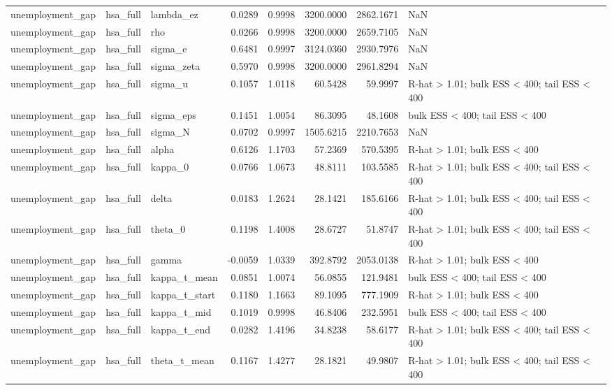 \begin{tabular}{lllrrrrl}
unemployment\_gap & hsa\_full & lambda\_ez & 0.0289 & 0.9998 & 3200.0000 & 2862.1671 & NaN \\
unemployment\_gap & hsa\_full & rho & 0.0266 & 0.9998 & 3200.0000 & 2659.7105 & NaN \\
unemployment\_gap & hsa\_full & sigma\_e & 0.6481 & 0.9997 & 3124.0360 & 2930.7976 & NaN \\
unemployment\_gap & hsa\_full & sigma\_zeta & 0.5970 & 0.9998 & 3200.0000 & 2961.8294 & NaN \\
unemployment\_gap & hsa\_full & sigma\_u & 0.1057 & 1.0118 & 60.5428 & 59.9997 & R-hat > 1.01; bulk ESS < 400; tail ESS < 400 \\
unemployment\_gap & hsa\_full & sigma\_eps & 0.1451 & 1.0054 & 86.3095 & 48.1608 & bulk ESS < 400; tail ESS < 400 \\
unemployment\_gap & hsa\_full & sigma\_N & 0.0702 & 0.9997 & 1505.6215 & 2210.7653 & NaN \\
unemployment\_gap & hsa\_full & alpha & 0.6126 & 1.1703 & 57.2369 & 570.5395 & R-hat > 1.01; bulk ESS < 400 \\
unemployment\_gap & hsa\_full & kappa\_0 & 0.0766 & 1.0673 & 48.8111 & 103.5585 & R-hat > 1.01; bulk ESS < 400; tail ESS < 400 \\
unemployment\_gap & hsa\_full & delta & 0.0183 & 1.2624 & 28.1421 & 185.6166 & R-hat > 1.01; bulk ESS < 400; tail ESS < 400 \\
unemployment\_gap & hsa\_full & theta\_0 & 0.1198 & 1.4008 & 28.6727 & 51.8747 & R-hat > 1.01; bulk ESS < 400; tail ESS < 400 \\
unemployment\_gap & hsa\_full & gamma & -0.0059 & 1.0339 & 392.8792 & 2053.0138 & R-hat > 1.01; bulk ESS < 400 \\
unemployment\_gap & hsa\_full & kappa\_t\_mean & 0.0851 & 1.0074 & 56.0855 & 121.9481 & bulk ESS < 400; tail ESS < 400 \\
unemployment\_gap & hsa\_full & kappa\_t\_start & 0.1180 & 1.1663 & 89.1095 & 777.1909 & R-hat > 1.01; bulk ESS < 400 \\
unemployment\_gap & hsa\_full & kappa\_t\_mid & 0.1019 & 0.9998 & 46.8406 & 232.5951 & bulk ESS < 400; tail ESS < 400 \\
unemployment\_gap & hsa\_full & kappa\_t\_end & 0.0282 & 1.4196 & 34.8238 & 58.6177 & R-hat > 1.01; bulk ESS < 400; tail ESS < 400 \\
unemployment\_gap & hsa\_full & theta\_t\_mean & 0.1167 & 1.4277 & 28.1821 & 49.9807 & R-hat > 1.01; bulk ESS < 400; tail ESS < 400 \\

\end{tabular}
